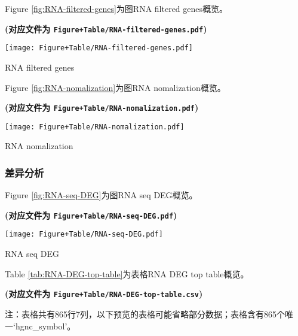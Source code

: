 \documentclass[
]{article}
\begin{document}
Figure \ref{fig:RNA-filtered-genes}为图RNA filtered genes概览。

\textbf{(对应文件为 \texttt{Figure+Table/RNA-filtered-genes.pdf})}

\def\@captype{figure}
\begin{center}
\texttt{[image: Figure+Table/RNA-filtered-genes.pdf]}
\caption{RNA filtered genes}\label{fig:RNA-filtered-genes}
\end{center}

Figure \ref{fig:RNA-nomalization}为图RNA nomalization概览。

\textbf{(对应文件为 \texttt{Figure+Table/RNA-nomalization.pdf})}

\def\@captype{figure}
\begin{center}
\texttt{[image: Figure+Table/RNA-nomalization.pdf]}
\caption{RNA nomalization}\label{fig:RNA-nomalization}
\end{center}

\hypertarget{ux5deeux5f02ux5206ux6790-1}{%
\subsubsection{差异分析}\label{ux5deeux5f02ux5206ux6790-1}}

Figure \ref{fig:RNA-seq-DEG}为图RNA seq DEG概览。

\textbf{(对应文件为 \texttt{Figure+Table/RNA-seq-DEG.pdf})}

\def\@captype{figure}
\begin{center}
\texttt{[image: Figure+Table/RNA-seq-DEG.pdf]}
\caption{RNA seq DEG}\label{fig:RNA-seq-DEG}
\end{center}

Table \ref{tab:RNA-DEG-top-table}为表格RNA DEG top table概览。

\textbf{(对应文件为 \texttt{Figure+Table/RNA-DEG-top-table.csv})}

\begin{center}\begin{tcolorbox}[colback=gray!10, colframe=gray!50, width=0.9\linewidth, arc=1mm, boxrule=0.5pt]注：表格共有865行7列，以下预览的表格可能省略部分数据；表格含有865个唯一`hgnc\_symbol'。
\end{tcolorbox}
\end{center}
\end{document}
